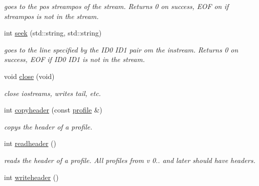 \begin{DoxyCompactItemize}
\begin{DoxyCompactList}\small\item\em goes to the pos streampos of the stream. Returns 0 on success, E\-O\-F on if streampos is not in the stream. \end{DoxyCompactList}\item 
\hypertarget{classprofile_aac930ebe1c76a67ffbab55905136bce2}{int \hyperlink{classprofile_aac930ebe1c76a67ffbab55905136bce2}{seek} (std\-::string, std\-::string)}\label{classprofile_aac930ebe1c76a67ffbab55905136bce2}

\begin{DoxyCompactList}\small\item\em goes to the line specified by the I\-D0 I\-D1 pair om the instream. Returns 0 on success, E\-O\-F if I\-D0 I\-D1 is not in the stream. \end{DoxyCompactList}\item 
void \hyperlink{classprofile_a6148476d9b8b5a5a20491450d92d0dcb}{close} (void)
\begin{DoxyCompactList}\small\item\em close iostreams, writes tail, etc. \end{DoxyCompactList}\item 
\hypertarget{classprofile_ada1dcfd3a02b7e2e06d11fa333f23a63}{int \hyperlink{classprofile_ada1dcfd3a02b7e2e06d11fa333f23a63}{copyheader} (const \hyperlink{classprofile}{profile} \&)}\label{classprofile_ada1dcfd3a02b7e2e06d11fa333f23a63}

\begin{DoxyCompactList}\small\item\em copys the header of a profile. \end{DoxyCompactList}\item 
\hypertarget{classprofile_a5b4058a8f0132b09130fbf586fddc39d}{int \hyperlink{classprofile_a5b4058a8f0132b09130fbf586fddc39d}{readheader} ()}\label{classprofile_a5b4058a8f0132b09130fbf586fddc39d}

\begin{DoxyCompactList}\small\item\em reads the header of a profile. All profiles from v 0.. and later should have headers. \end{DoxyCompactList}\item 
\hypertarget{classprofile_a2a779c8acb71361916712139ed427c9b}{int \hyperlink{classprofile_a2a779c8acb71361916712139ed427c9b}{writeheader} ()}\label{classprofile_a2a779c8acb71361916712139ed427c9b}


\end{DoxyCompactItemize}
